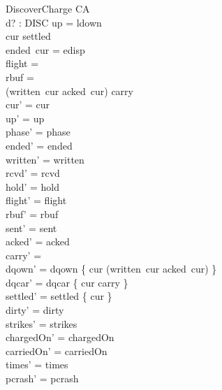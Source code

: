 \documentclass[a4paper,10pt,fleqn]{article}
\begin{document}
\begin{schema}{DiscoverCharge}
  \Delta CA \\
  d? : DISC
\where
  up = ldown \\
  cur \notin settled \\
  ended~cur = edisp \\
  flight = \emptyset \\
  rbuf = \emptyset \\
  (written~cur \setminus acked~cur) \cup carry \neq \emptyset \\
  cur' = cur \\
  up' = up \\
  phase' = phase \\
  ended' = ended \\
  written' = written \\
  rcvd' = rcvd \\
  hold' = hold \\
  flight' = flight \\
  rbuf' = rbuf \\
  sent' = sent \\
  acked' = acked \\
  carry' = \emptyset \\
  dqown' = dqown \cup \{ cur \mapsto (written~cur \setminus acked~cur) \} \\
  dqcar' = dqcar \cup \{ cur \mapsto carry \} \\
  settled' = settled \cup \{ cur \} \\
  dirty' = dirty \\
  strikes' = strikes \\
  chargedOn' = chargedOn \\
  carriedOn' = carriedOn \\
  times' = times \\
  pcrash' = pcrash
\end{schema}
\end{document}
